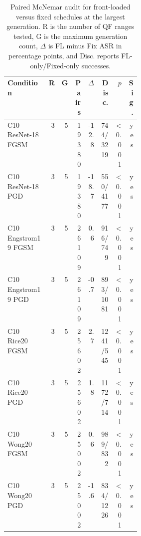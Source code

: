 \begin{table}[t]
\caption{Paired McNemar audit for front-loaded versus fixed schedules at the largest generation. R is the number of QF ranges tested, G is the maximum generation count, \(\Delta\) is FL minus Fix ASR in percentage points, and Disc. reports FL-only/Fixed-only successes.}
\label{tab:mcnemar-audit}
\centering
\tiny
{\setlength{\tabcolsep}{1.5pt}
\begin{tabular}{@{}p{0.31\linewidth}rrrrrrr@{}}
\hline
Condition & R & G & Pairs & \(\Delta\) & Disc. & \(p\) & Sig. \\
\hline
C10 ResNet-18 FGSM & 3 & 5 & 19380 & -12.8 & 744/3219 & <0.001 & yes \\
C10 ResNet-18 PGD & 3 & 5 & 19380 & -18.7 & 550/4177 & <0.001 & yes \\
C10 Engstrom19 FGSM & 3 & 5 & 26109 & 0.6 & 916/749 & <0.001 & yes \\
C10 Engstrom19 PGD & 3 & 5 & 26109 & -0.7 & 893/1081 & <0.001 & yes \\
C10 Rice20 FGSM & 3 & 5 & 25602 & 2.7 & 1241/545 & <0.001 & yes \\
C10 Rice20 PGD & 3 & 5 & 25602 & 1.8 & 1172/714 & <0.001 & yes \\
C10 Wong20 FGSM & 3 & 5 & 25002 & 0.6 & 989/832 & <0.001 & yes \\
C10 Wong20 PGD & 3 & 5 & 25002 & -1.6 & 834/1226 & <0.001 & yes \\
\hline
\end{tabular}
}
\end{table}
